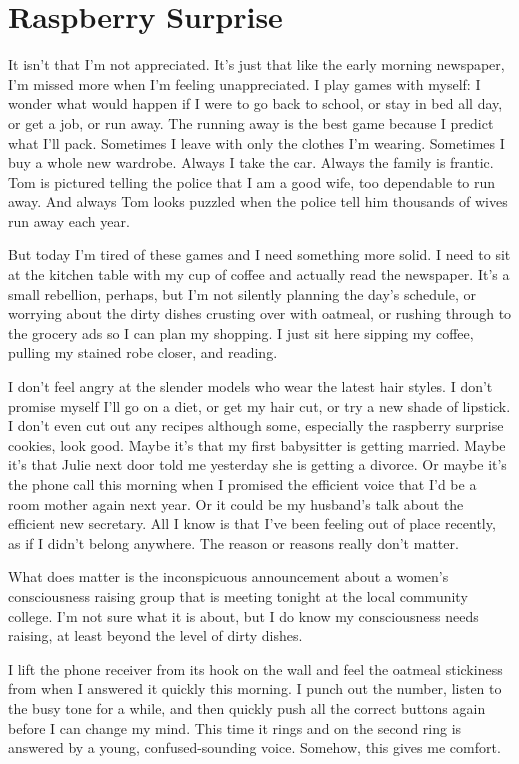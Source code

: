 \documentclass[twoside,10pt]{book}
\begin{document}
\cleardoublepage
\chapter{Raspberry Surprise}

It isn't that I'm not appreciated. It's just that like the early morning
newspaper, I'm missed more when I'm feeling unappreciated. I play games
with myself: I wonder what would happen if I were to go back to school,
or stay in bed all day, or get a job, or run away. The running away is
the best game because I predict what I'll pack. Sometimes I leave with
only the clothes I'm wearing. Some­times I buy a whole new wardrobe.
Always I take the car. Always the family is frantic. Tom is pictured
telling the police that I am a good wife, too dependable to run away.
And always Tom looks puzzled when the police tell him thousands of wives
run away each year.

But today I'm tired of these games and I need something more solid. I
need to sit at the kitchen table with my cup of coffee and actually read
the newspaper. It's a small rebellion, perhaps, but I'm not silently
planning the day's schedule, or worrying about the dirty dishes crusting
over with oatmeal, or rushing through to the grocery ads so I can plan
my shopping. I just sit here sipping my coffee, pulling my stained robe
closer, and reading.

I don't feel angry at the slender models who wear the latest hair
styles. I don't promise myself I'll go on a diet, or get my hair cut, or
try a new shade of lipstick. I don't even cut out any recipes although
some, especially the raspberry surprise cookies, look good. Maybe it's
that my first babysitter is getting married. Maybe it's that Julie next
door told me yesterday she is getting a divorce. Or maybe it's the phone
call this morning when I promised the efficient voice that I'd be a room
mother again next year. Or it could be my husband's talk about the
efficient new secretary. All I know is that I've been feeling out of
place recently, as if I didn't belong anywhere. The reason or reasons
really don't matter.

What does matter is the inconspicuous announcement about a women's
consciousness raising group that is meeting tonight at the local
community college. I'm not sure what it is about, but I do know my
consciousness needs raising, at least beyond the level of dirty dishes.

I lift the phone receiver from its hook on the wall and feel the oatmeal
stickiness from when I answered it quickly this morning. I punch out the
number, listen to the busy tone for a while, and then quickly push all
the correct buttons again before I can change my mind. This time it
rings and on the second ring is answered by a young, confused-sounding
voice. Somehow, this gives me comfort.
\end{document}
